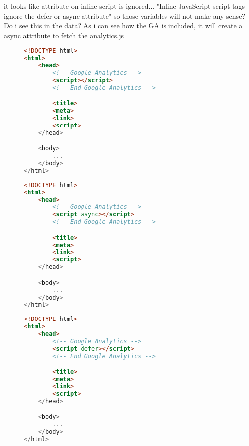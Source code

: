 
it looks like attribute on inline script is ignored... "Inline JavaScript script tags ignore the defer or async attribute"
so those variables will not make any sense? Do i see this in the data?
As i can see how the GA is included, it will create a async attribute to fetch the analytics.js

\begin{sidewaysfigure}

\begin{multicols}{3}

\begin{center}
\begin{lstlisting}[caption={Attribute 1}, language=html, numbers=none]
<!DOCTYPE html>
<html>
    <head>
        <!-- Google Analytics -->
        <script></script>
        <!-- End Google Analytics -->

        <title>
        <meta>
        <link>
        <script>
    </head>

    <body>
        ...
    </body>
</html>
\end{lstlisting}
\end{center}

\columnbreak

\begin{center}
\begin{lstlisting}[caption={Attribute 2}, language=html, numbers=none]
<!DOCTYPE html>
<html>
    <head>
        <!-- Google Analytics -->
        <script async></script>
        <!-- End Google Analytics -->

        <title>
        <meta>
        <link>
        <script>
    </head>

    <body>
        ...
    </body>
</html>
\end{lstlisting}
\end{center}

\columnbreak

\begin{center}
\begin{lstlisting}[caption={Attribute 3}, language=html, numbers=none]
<!DOCTYPE html>
<html>
    <head>
        <!-- Google Analytics -->
        <script defer></script>
        <!-- End Google Analytics -->

        <title>
        <meta>
        <link>
        <script>
    </head>

    <body>
        ...
    </body>
</html>
\end{lstlisting}
\end{center}

\end{multicols}

\end{sidewaysfigure}



